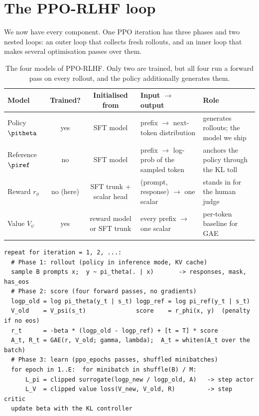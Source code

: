 \section{The PPO-RLHF loop}\label{sec:rlhf:loop}

We now have every component. One PPO iteration has three phases and two nested loops: an outer
loop that collects fresh rollouts, and an inner loop that makes several optimisation passes over them.

\begin{table}[ht]
\centering\small
\begin{tabularx}{\linewidth}{@{}lccXX@{}}
\toprule
\textbf{Model} & \textbf{Trained?} & \textbf{Initialised from} & \textbf{Input $\to$ output} & \textbf{Role}\\
\midrule
Policy $\pitheta$ & yes & SFT model & prefix $\to$ next-token distribution & generates rollouts; the model we ship\\
Reference $\piref$ & no & SFT model & prefix $\to$ log-prob of the sampled token & anchors the policy through the KL toll\\
Reward $r_\phi$ & no (here) & SFT trunk + scalar head & (prompt, response) $\to$ one scalar & stands in for the human judge\\
Value $V_\psi$ & yes & reward model or SFT trunk & every prefix $\to$ one scalar & per-token baseline for GAE\\
\bottomrule
\end{tabularx}
\caption{The four models of PPO-RLHF. Only two are trained, but all four run a forward pass on every
rollout, and the policy additionally generates them.}
\label{tab:rlhf:roles}
\end{table}

\begin{lstlisting}[style=plain,caption={One PPO-RLHF iteration in pseudocode.},label={lst:rlhf:pseudo}]
repeat for iteration = 1, 2, ...:
  # Phase 1: rollout (policy in inference mode, KV cache)
  sample B prompts x;  y ~ pi_theta(. | x)       -> responses, mask, has_eos
  # Phase 2: score (four forward passes, no gradients)
  logp_old = log pi_theta(y_t | s_t) logp_ref = log pi_ref(y_t | s_t)
  V_old    = V_psi(s_t)              score    = r_phi(x, y)  (penalty if no eos)
  r_t      = -beta * (logp_old - logp_ref) + [t = T] * score
  A_t, R_t = GAE(r, V_old; gamma, lambda);  A_t = whiten(A_t over the batch)
  # Phase 3: learn (ppo_epochs passes, shuffled minibatches)
  for epoch in 1..E:  for minibatch in shuffle(B) / M:
      L_pi = clipped surrogate(logp_new / logp_old, A)   -> step actor
      L_V  = clipped value loss(V_new, V_old, R)         -> step critic
  update beta with the KL controller
\end{lstlisting}

